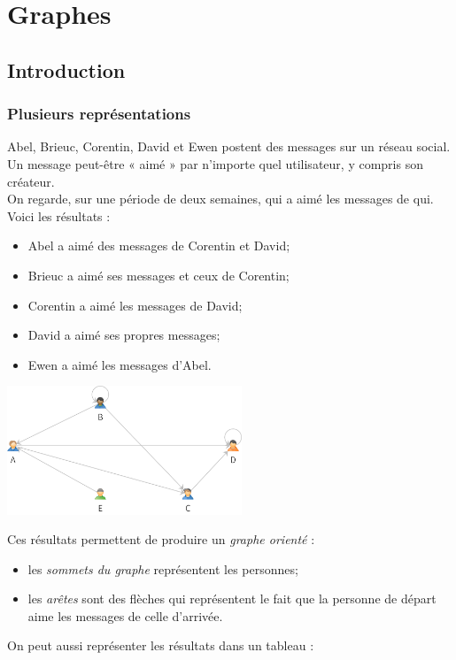 \chapter{Graphes}
\section{Introduction}
\subsection{Plusieurs représentations}

Abel, Brieuc, Corentin, David et Ewen postent des messages sur un réseau social. Un message peut-être  «  aimé »  par n'importe quel utilisateur, y compris son créateur.\\
On regarde, sur une période de deux semaines, qui a aimé les messages de qui. Voici les résultats :
\begin{itemize}
    \item 	Abel a aimé des messages de Corentin  et David;
    \item 	Brieuc a aimé ses messages et ceux de Corentin;
    \item 	Corentin a aimé les messages de David;
    \item 	David a aimé ses propres messages;
    \item 	Ewen a aimé les messages d'Abel.
\end{itemize}
\begin{center}
    \includegraphics[width=7cm]{graphes/img/graphe1.png}
\end{center}
Ces résultats permettent de produire un \textit{graphe orienté} :
\begin{itemize}
    \item 	les \textit{sommets du graphe} représentent les personnes;
    \item 	les \textit{arêtes} sont des flèches qui représentent le fait que la personne de départ aime les messages de celle d'arrivée.
\end{itemize}
On peut aussi représenter les résultats dans un tableau :
